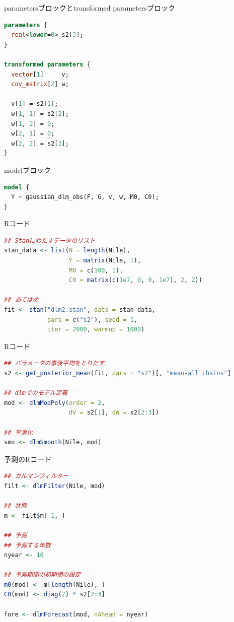 \documentclass[dvipdfmx,12pt]{beamer}
\begin{document}
\begin{frame}[fragile]{parametersブロックとtransformed parametersブロック}
  \begin{lstlisting}[language=Stan]
parameters {
  real<lower=0> s2[3];
}

transformed parameters {
  vector[1]     v;
  cov_matrix[2] w;

  v[1] = s2[1];
  w[1, 1] = s2[2];
  w[1, 2] = 0;
  w[2, 1] = 0;
  w[2, 2] = s2[3];
}
  \end{lstlisting}
\end{frame}

\begin{frame}[fragile]{modelブロック}
  \begin{lstlisting}[language=Stan]
model {
  Y ~ gaussian_dlm_obs(F, G, v, w, M0, C0);
}
  \end{lstlisting}
\end{frame}

\begin{frame}[fragile]{Rコード}
  \begin{lstlisting}[language=R]
## Stanにわたすデータのリスト
stan_data <- list(N = length(Nile),
                  Y = matrix(Nile, 1),
                  M0 = c(100, 1),
                  C0 = matrix(c(1e7, 0, 0, 1e7), 2, 2))

## あてはめ
fit <- stan("dlm2.stan", data = stan_data,
            pars = c("s2"), seed = 1,
            iter = 2000, warmup = 1000)
  \end{lstlisting}
\end{frame}

\begin{frame}[fragile]{Rコード}
  \begin{lstlisting}[language=R]
## パラメータの事後平均をとりだす
s2 <- get_posterior_mean(fit, pars = "s2")[, "mean-all chains"]

## dlmでのモデル定義
mod <- dlmModPoly(order = 2,
                  dV = s2[1], dW = s2[2:3])

## 平滑化
smo <- dlmSmooth(Nile, mod)
  \end{lstlisting}
\end{frame}

\begin{frame}[fragile]{予測のRコード}
  \begin{lstlisting}[language=R]
## カルマンフィルター
filt <- dlmFilter(Nile, mod)

## 状態
m <- filt$m[-1, ]

## 予測
## 予測する年数
nyear <- 10

## 予測期間の初期値の設定
m0(mod) <- m[length(Nile), ]
C0(mod) <- diag(2) * s2[2:3]

fore <- dlmForecast(mod, nAhead = nyear)
  \end{lstlisting}
\end{frame}
\end{document}
